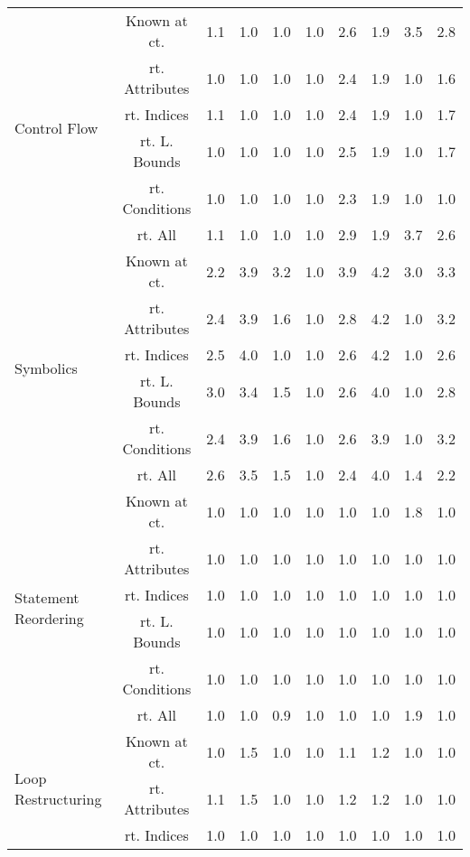 \documentclass{article}
\begin{document}
\begin{longtable}{|p{2cm}||c|c|c|c|c|c|c|c|c|}
\hline
\multirow{6}{*}{ \parbox{2cm}{Control Flow}} & Known at ct. & 1.1 & 1.0 & 1.0 & 1.0 & 2.6 & 1.9 & 3.5 & 2.8\\ \cline{2-10}
 & rt. Attributes & 1.0 & 1.0 & 1.0 & 1.0 & 2.4 & 1.9 & 1.0 & 1.6\\ \cline{2-10}
 & rt. Indices & 1.1 & 1.0 & 1.0 & 1.0 & 2.4 & 1.9 & 1.0 & 1.7\\ \cline{2-10}
 & rt. L. Bounds & 1.0 & 1.0 & 1.0 & 1.0 & 2.5 & 1.9 & 1.0 & 1.7\\ \cline{2-10}
 & rt. Conditions & 1.0 & 1.0 & 1.0 & 1.0 & 2.3 & 1.9 & 1.0 & 1.0\\ \cline{2-10}
 & rt. All & 1.1 & 1.0 & 1.0 & 1.0 & 2.9 & 1.9 & 3.7 & 2.6\\ \cline{2-10}
\hline
\multirow{6}{*}{ \parbox{2cm}{Symbolics}} & Known at ct. & 2.2 & 3.9 & 3.2 & 1.0 & 3.9 & 4.2 & 3.0 & 3.3\\ \cline{2-10}
 & rt. Attributes & 2.4 & 3.9 & 1.6 & 1.0 & 2.8 & 4.2 & 1.0 & 3.2\\ \cline{2-10}
 & rt. Indices & 2.5 & 4.0 & 1.0 & 1.0 & 2.6 & 4.2 & 1.0 & 2.6\\ \cline{2-10}
 & rt. L. Bounds & 3.0 & 3.4 & 1.5 & 1.0 & 2.6 & 4.0 & 1.0 & 2.8\\ \cline{2-10}
 & rt. Conditions & 2.4 & 3.9 & 1.6 & 1.0 & 2.6 & 3.9 & 1.0 & 3.2\\ \cline{2-10}
 & rt. All & 2.6 & 3.5 & 1.5 & 1.0 & 2.4 & 4.0 & 1.4 & 2.2\\ \cline{2-10}
\hline
\multirow{6}{*}{ \parbox{2cm}{Statement Reordering}} & Known at ct. & 1.0 & 1.0 & 1.0 & 1.0 & 1.0 & 1.0 & 1.8 & 1.0\\ \cline{2-10}
 & rt. Attributes & 1.0 & 1.0 & 1.0 & 1.0 & 1.0 & 1.0 & 1.0 & 1.0\\ \cline{2-10}
 & rt. Indices & 1.0 & 1.0 & 1.0 & 1.0 & 1.0 & 1.0 & 1.0 & 1.0\\ \cline{2-10}
 & rt. L. Bounds & 1.0 & 1.0 & 1.0 & 1.0 & 1.0 & 1.0 & 1.0 & 1.0\\ \cline{2-10}
 & rt. Conditions & 1.0 & 1.0 & 1.0 & 1.0 & 1.0 & 1.0 & 1.0 & 1.0\\ \cline{2-10}
 & rt. All & 1.0 & 1.0 & 0.9 & 1.0 & 1.0 & 1.0 & 1.9 & 1.0\\ \cline{2-10}
\hline
\multirow{6}{*}{ \parbox{2cm}{Loop Restructuring}} & Known at ct. & 1.0 & 1.5 & 1.0 & 1.0 & 1.1 & 1.2 & 1.0 & 1.0\\ \cline{2-10}
 & rt. Attributes & 1.1 & 1.5 & 1.0 & 1.0 & 1.2 & 1.2 & 1.0 & 1.0\\ \cline{2-10}
 & rt. Indices & 1.0 & 1.0 & 1.0 & 1.0 & 1.0 & 1.0 & 1.0 & 1.0\\ \cline{2-10}

\end{longtable}
\end{document}
